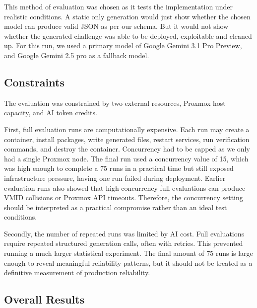 This method of evaluation was chosen as it tests the implementation under realistic conditions. A static only generation would just show whether the chosen model can produce valid JSON as per our schema. But it would not show whether the generated challenge was able to be deployed, exploitable and cleaned up. For this run, we used a primary model of Google Gemini 3.1 Pro Preview, and Google Gemini 2.5 pro as a fallback model.

\subsection{Constraints}\label{sec:eval-constraints}

The evaluation was constrained by two external resources, Proxmox host capacity, and AI token credits.

First, full evaluation runs are computationally expensive. Each run may create a container, install packages, write generated files, restart services, run verification commands, and destroy the container. Concurrency had to be capped as we only had a single Proxmox node. The final run used a concurrency value of 15, which was high enough to complete a 75 runs in a practical time but still exposed infrastructure pressure, having one run failed during deployment. Earlier evaluation runs also showed that high concurrency full evaluations can produce VMID collisions or Proxmox API timeouts. Therefore, the concurrency setting should be interpreted as a practical compromise rather than an ideal test conditions.

Secondly, the number of repeated runs was limited by AI cost. Full evaluations require repeated structured generation calls, often with retries. This prevented running a much larger statistical experiment. The final amount of 75 runs is large enough to reveal meaningful reliability patterns, but it should not be treated as a definitive measurement of production reliability.


\subsection{Overall Results}\label{sec:overall-results}

